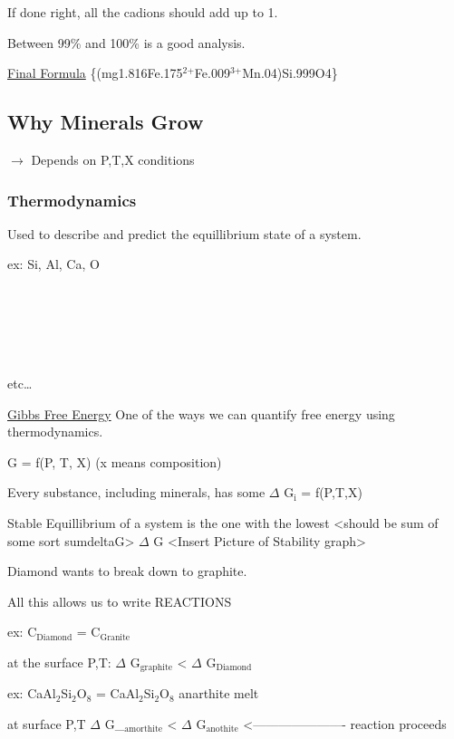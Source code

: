 \documentclass[11pt]{article}
\begin{document}
If done right, all the cadions should add up to 1.




Between 99\% and 100\% is a good analysis.

\uline{Final Formula}
 \ce\{(mg1.816Fe.175$^{\text{2+}}$Fe.009$^{\text{3+}}$Mn.04)Si.999O4\}

\subsection{Why Minerals Grow}
\label{sec-2-1}
$\rightarrow$ Depends on P,T,X conditions
\subsubsection{Thermodynamics}
\label{sec-2-1-1}
Used to describe and predict the equillibrium state of a system.

ex: Si, Al, Ca, O

\\
\\
\\
\\
\\
etc\ldots{}

\uline{Gibbs Free Energy}
One of the ways we can quantify free energy using thermodynamics.

G = f(P, T, X) (x means composition)

Every substance, including minerals, has some $\Delta$ G$_{\text{i}}$ = f(P,T,X)

Stable Equillibrium of a system is the one with the lowest 
<should be sum of some sort sumdeltaG>
\Sum $\Delta$ G
<Insert Picture of Stability graph>

Diamond wants to break down to graphite. 

All this allows us to write REACTIONS

ex: C$_{\text{Diamond}}$ = C$_{\text{Granite}}$

at the surface P,T: $\Delta$ G$_{\text{graphite}}$ \textless{} $\Delta$ G$_{\text{Diamond}}$

ex: CaAl$_{\text{2}}$Si$_{\text{2}}$O$_{\text{8}}$ = CaAl$_{\text{2}}$Si$_{\text{2}}$O$_{\text{8}}$
      anarthite                melt

at surface P,T            $\Delta$ G\_$_{\text{amorthite}}$ < $\Delta$ G$_{\text{anothite}}$
                                              <----------------------
                                                   reaction proceeds
\end{document}
